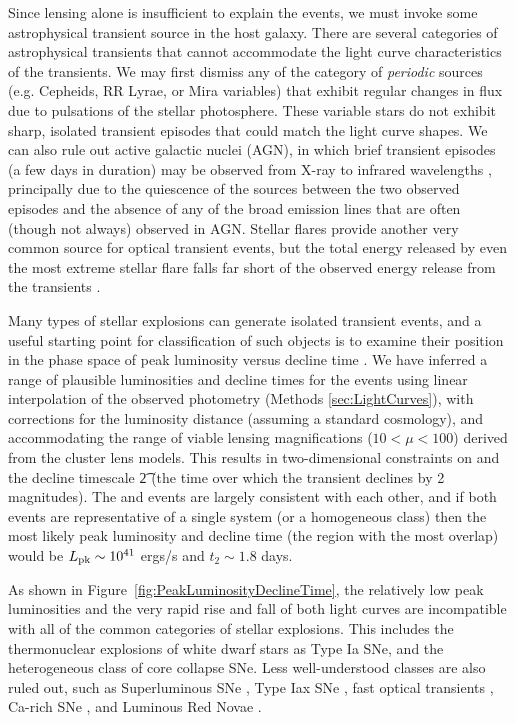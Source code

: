 Since lensing alone is insufficient to explain the \spock events, we
must invoke some astrophysical transient source in the host galaxy.
There are several categories of astrophysical transients that cannot
accommodate the light curve characteristics of the \spock transients.
We may first dismiss any of the category of {\it periodic} sources
(e.g. Cepheids, RR Lyrae, or Mira variables) that exhibit regular
changes in flux due to pulsations of the stellar photosphere. These
variable stars do not exhibit sharp, isolated transient episodes that
could match the \spock light curve shapes. We can also rule out active
galactic nuclei (AGN), in which brief transient episodes (a few days
in duration) may be observed from X-ray to infrared wavelengths
\citep[e.g.][]{Gaskell:2003}, principally due to the quiescence of the
\spock sources between the two observed episodes and the absence of
any of the broad emission lines that are often (though not always)
observed in AGN. Stellar flares provide another very common source for
optical transient events, but the total energy released by even the
most extreme stellar flare falls far short of the observed energy
release from the \spock transients \citep{Balona:2012,Karoff:2016} .

Many types of stellar explosions can generate isolated
transient events, and a useful starting point for classification of
such objects is to examine their position in the phase
space of peak luminosity versus decline time \citep[see,
  e.g.,][]{Kulkarni:2007}. We have inferred a range of plausible
luminosities and decline times for the \spock events using linear
interpolation of the observed photometry (Methods
\ref{sec:LightCurves}), with corrections for the luminosity distance
(assuming a standard \LCDM cosmology), and accommodating the range of
viable lensing magnifications ($10<\mu<100$) derived from the cluster
lens models. This results in two-dimensional constraints on \Lpk and
the decline timescale \t2 (the time over which the transient declines
by 2 magnitudes). The \spockone and \spocktwo events are largely
consistent with each other, and if both events are representative of a
single system (or a homogeneous class) then the most likely peak
luminosity and decline time (the region with the most overlap) would
be $L_{\rm pk}\sim10^{41}$ ergs/s and $t_2\sim1.8$ days.

As shown in Figure~\ref{fig:PeakLuminosityDeclineTime}, the relatively
low peak luminosities and the very rapid rise and fall of both \spock
light curves are incompatible with all of the common categories of
stellar explosions. This includes the thermonuclear explosions of
white dwarf stars as Type Ia SNe, and the heterogeneous class of
core collapse SNe.  Less well-understood classes are also
ruled out, such as Superluminous SNe \citep{Gal-Yam:2012,Arcavi:2016},
Type Iax SNe \citep{Foley:2013a}, fast optical transients
\citep{Drout:2014}, Ca-rich SNe
\citep{Filippenko:2003,Perets:2011,Kasliwal:2012}, and Luminous Red
Novae \citep[also called intermediate luminosity red
  transients;][]{Munari:2002,Kulkarni:2007,Kasliwal:2011b}.

